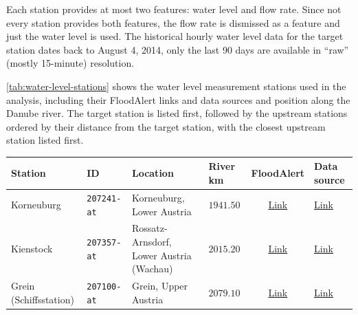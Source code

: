 Each station provides at most two features: water level and flow rate. Since not every station provides both features, the flow rate is dismissed as a feature and just the water level is used. The historical hourly water level data for the target station dates back to August 4, 2014, only the last 90 days are available in ``raw'' (mostly 15-minute) resolution.

\autoref{tab:water-level-stations} shows the water level measurement stations used in the analysis, including their FloodAlert links and data sources and position along the Danube river. The target station is listed first, followed by the upstream stations ordered by their distance from the target station, with the closest upstream station listed first.
\begin{table}[htbp]
    \centering
    \begin{tabularx}{\textwidth}{@{} l l X l c X @{}}
        \toprule
        \textbf{Station} &
        \textbf{ID} &
        \textbf{Location} &
        \textbf{River km} &
        \textbf{FloodAlert} &
        \textbf{Data source} \\
        \midrule
        Korneuburg &
        \texttt{207241-at} &
        Korneuburg, Lower Austria &
        $1941.50$ &
        \href{https://pegelalarm.at/paw/?initHideSms=true\&commonid=207241-at}{Link} \cite{FloodAlertWaterLevels} &
        \href{https://www.noe.gv.at/wasserstand/\#/en/Messstellen/Details/207241/Wasserstand/3Tage}{Link} \cite{WasserstandsnachrichtenUndHochwasserprognosen} \\

        Kienstock &
        \texttt{207357-at} &
        Rossatz-Arnsdorf, Lower Austria (Wachau) &
        $2015.20$ &
        \href{https://pegelalarm.at/paw/?initHideSms=true\&commonid=207357-at}{Link} \cite{FloodAlertWaterLevels} &
        \href{https://www.noe.gv.at/wasserstand/\#/en/Messstellen/Details/207357/Wasserstand/3Tage}{Link} \cite{WasserstandsnachrichtenUndHochwasserprognosen} \\

        Grein (Schiffsstation) &
        \texttt{207100-at} &
        Grein, Upper Austria &
        $2079.10$ &
        \href{https://pegelalarm.at/paw/?initHideSms=true\&commonid=207100-at}{Link} \cite{FloodAlertWaterLevels} &
        \href{https://hydro.ooe.gv.at/\#/overview/Wasserstand/station/16670/Grein+\%28Schiffsstation\%29/Wasserstand?period=P7D}{Link} \cite{HydrographischerDienstOberosterreich} \\


\end{tabularx}
\end{table}

